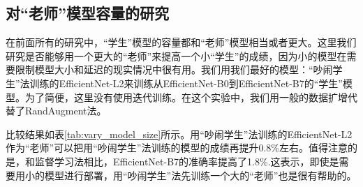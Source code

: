 \documentclass[10pt]{article}
\begin{document}
\subsection{对“老师”模型容量的研究}
在前面所有的研究中，“学生”模型的容量都和“老师”模型相当或者更大。这里我们研究是否能够用一个更大的“老师”来提高一个小“学生”的成绩，因为小的模型在需要限制模型大小和延迟的现实情况中很有用。我们用我们最好的模型：“吵闹学生”法训练的EfficientNet-L2来训练从EfficientNet-B0到EfficientNet-B7的“学生”模型。为了简便，这里没有使用迭代训练。在这个实验中，我们用一般的数据扩增代替了RandAugment法。  


比较结果如表\ref{tab:vary_model_size}所示。用“吵闹学生”法训练的EfficientNet-L2作为“老师”可以把用“吵闹学生”法训练的模型的成绩再提升0.8\%左右。值得注意的是，和监督学习法相比，EfficientNet-B7的准确率提高了1.8\%.这表示，即使是需要用小的模型进行部署，用“吵闹学生”法先训练一个大的“老师”也是很有帮助的。
\end{document}
